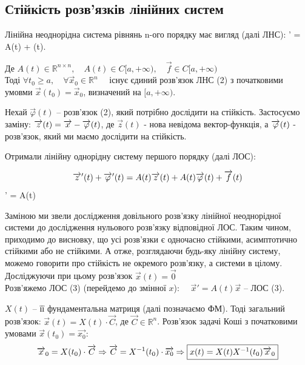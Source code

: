 \documentclass[14pt,a4paper]{scrartcl}
\theoremstyle{definition}
\theoremstyle{definition}
\theoremstyle{definition}
\begin{document}
\subsection{Стійкість розв'язків лінійних систем}
Лінійна неоднорідна система рівнянь n-ого порядку має вигляд (далі ЛНС):
\be
{}' = A(t)  +  (t).
\ee

$ \text{Де } A(t) \in \mathbb{R}^{n \times n}, \quad A(t) \in C [ a, + \infty), \quad \overrightarrow{f} \in C[a, + \infty)$ \\

Тоді $\forall t_0 \geq a, \quad \forall \overrightarrow{x}_0 \in \mathbb{R}^n \quad$ існує єдиний розв'язок ЛНС (2) з початковими умовми $\overrightarrow{x}(t_0) = \overrightarrow{x}_0$, визначений на $[a, +\infty)$.

Нехай $\overrightarrow{\varphi}(t)$ -- розв'язок (2), який потрібно дослідити на стійкість.
Застосуємо заміну: $ \overrightarrow{z} (t) = \overrightarrow{x} - \overrightarrow{\varphi} (t)$, де $ \overrightarrow{z}(t)$ - нова невідома вектор-функція, а $\overrightarrow{\varphi} (t)$ - розв'язок, який ми маємо дослідити на стійкість.

Отримали лінійну однорідну систему першого порядку (далі ЛОС):

$$ \overrightarrow{z}'(t)   + \overrightarrow{\varphi}'(t) = A(t)\overrightarrow{z}(t) + A(t)\overrightarrow{\varphi}(t) + \overrightarrow{f}(t) $$
\be
{}' = A(t)  
\ee

Заміною ми звели дослідження довільного розв'язку лінійної неоднорідної системи до дослідження нульового розв'язку відповідної ЛОС. Таким чином, приходимо до висновку, що усі розв'язки є одночасно стійкими, асимптотично стійкими або не стійкими. А отже, розглядаючи будь-яку лінійну систему, можемо говорити про стійкість не окремого розв'язку, а системи в цілому. Досліджуючи при цьому розв'язок $\overrightarrow{x}(t) = \overrightarrow{0}$\\

Розв'яжемо ЛОС (3) (перейдемо до змінної $x$): $\quad \overrightarrow{x}'  =  A(t) \overrightarrow{x} $ -- ЛОС (3).

$X(t) $ -- її фундаментальна матриця (далі позначаємо ФМ). Тоді загальний розв'язок: $ \overrightarrow{x} (t) = X(t) \cdot \overrightarrow{C}$, де $\overrightarrow{ C} \in \mathbb{R}^n$.
Розв'язок задачі Коші з початковими умовами $ \overrightarrow{x} (t_0) = \overrightarrow{x_0}$:
$$
\overrightarrow{x}_0 = X(t_0) \cdot \overrightarrow{C} \Rightarrow \overrightarrow{C} = X^{-1} (t_0) \cdot \overrightarrow{x_0} \Rightarrow \fbox{$x(t) = X(t) X^{-1}(t_0) \overrightarrow{x}_0$}
$$
\end{document}
